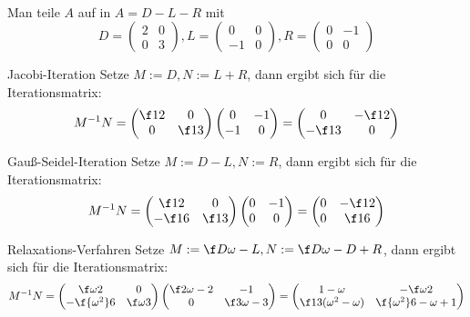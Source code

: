 \documentclass{scrartcl}
\begin{document}
	\begin{aufgabe}~

		Man teile $A$ auf in $A= D - L - R$ mit
		\[
			D=\begin{pmatrix}2&0\\0&3\end{pmatrix},
			L=\begin{pmatrix}0&0\\-1&0\end{pmatrix},
			R=\begin{pmatrix}0&-1\\0&0\end{pmatrix}
		\]
		\begin{seg}{Jacobi-Iteration}
			Setze $M:=D, N:=L+R$, dann ergibt sich für die Iterationsmatrix:
			\[
				M^{-1}N = \begin{pmatrix}\f12&0\\0&\f13\end{pmatrix}\begin{pmatrix}0&-1\\-1&0\end{pmatrix} = \begin{pmatrix}0&-\f12\\-\f13&0\end{pmatrix}
			\]
		\end{seg}
		\begin{seg}{Gauß-Seidel-Iteration}
			Setze $M:=D-L, N:=R$, dann ergibt sich für die Iterationsmatrix:
			\[
				M^{-1}N = \begin{pmatrix}\f12&0\\-\f16&\f13\end{pmatrix}\begin{pmatrix}0&-1\\0&0\end{pmatrix} = \begin{pmatrix}0&-\f12\\0&\f16\end{pmatrix}
			\]
		\end{seg}
		\begin{seg}{Relaxations-Verfahren}
			Setze $M:=\f D\omega -L, N:= \f D\omega -D + R$, dann ergibt sich für die Iterationsmatrix:
			\[
				M^{-1}N = \begin{pmatrix}\f \omega2 & 0\\-\f{\omega^2}6 & \f\omega3\end{pmatrix}\begin{pmatrix}\f2\omega-2&-1\\0&\f3\omega-3\end{pmatrix} = \begin{pmatrix}1-\omega & -\f\omega2\\\f13(\omega^2-\omega)&\f{\omega^2}6-\omega +1\end{pmatrix}
			\]
		\end{seg}


\end{aufgabe}
\end{document}
